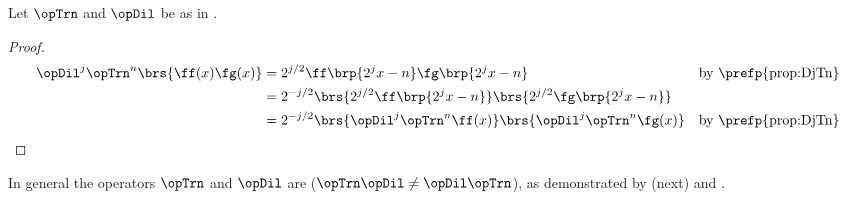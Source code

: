 

\begin{proposition}
\label{prop:DjTnfg}
Let $\opTrn$ and $\opDil$ be as in .
\end{proposition}
\begin{proof}
  \begin{align*}
    \opDil^j\opTrn^n\brs{\ff(x)\fg(x)}
      &= 2^{j/2}
         \ff\brp{2^jx-n}
         \fg\brp{2^jx-n}
      && \text{by \prefp{prop:DjTn}}
    \\&= 2^{-j/2}
         \brs{2^{j/2}\ff\brp{2^jx-n}}
         \brs{2^{j/2}\fg\brp{2^jx-n}}
    \\&= 2^{-j/2}
         \brs{\opDil^j\opTrn^n\ff(x)} \brs{\opDil^j\opTrn^n\fg(x)}
      && \text{by \prefp{prop:DjTn}}
  \end{align*}
\end{proof}

In general the operators $\opTrn$ and $\opDil$ are  ($\opTrn\opDil\neq\opDil\opTrn$),
as demonstrated by  (next) and .
\begin{counterex}
\label{cnt:DTTD}
\end{counterex}

